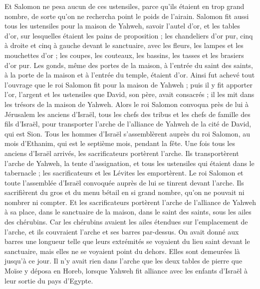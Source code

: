 \begin{multicols}{2}
Et Salomon ne pesa aucun de ces ustensiles, parce qu'ils étaient en trop grand nombre, de sorte qu'on ne rechercha point le poids de l’airain.
Salomon fit aussi tous les ustensiles pour la maison de Yahweh, savoir l'autel d'or, et les tables d'or, sur lesquelles étaient les pains de proposition ;
les chandeliers d’or pur, cinq à droite et cinq à gauche devant le sanctuaire, avec les fleurs, les lampes et les mouchettes d'or ;
les coupes, les couteaux, les bassins, les tasses et les brasiers d’or pur. Les gonds, même des portes de la maison, à l’entrée du saint des saints, à la porte de la maison et à l’entrée du temple, étaient d'or.
Ainsi fut achevé tout l'ouvrage que le roi Salomon fit pour la maison de Yahweh ; puis il y fit apporter l'or, l’argent et les ustensiles que David, son père, avait consacrés ; il les mit dans les trésors de la maison de Yahweh.
\VerseOne{}Alors le roi Salomon convoqua près de lui à Jérusalem les anciens d'Israël, tous les chefs des tribus et les chefs de famille des fils d'Israël, pour transporter l'arche de l'alliance de Yahweh de la cité de David, qui est Sion.
Tous les hommes d'Israël s’assemblèrent auprès du roi Salomon, au mois d'Ethanim, qui est le septième mois, pendant la fête.
Une fois tous les anciens d'Israël arrivés, les sacrificateurs portèrent l'arche.
Ils transportèrent l'arche de Yahweh, la tente d'assignation, et tous les ustensiles qui étaient dans le tabernacle ; les sacrificateurs et les Lévites les emportèrent.
Le roi Salomon et toute l'assemblée d'Israël convoquée auprès de lui se tinrent devant l'arche. Ils sacrifièrent du gros et du menu bétail en si grand nombre, qu'on ne pouvait ni nombrer ni compter.
Et les sacrificateurs portèrent l'arche de l'alliance de Yahweh à sa place, dans le sanctuaire de la maison, dans le saint des saints, sous les ailes des chérubins.
Car les chérubins avaient les ailes étendues sur l’emplacement de l'arche, et ils couvraient l'arche et ses barres par-dessus.
On avait donné aux barres une longueur telle que leurs extrémités se voyaient du lieu saint devant le sanctuaire, mais elles ne se voyaient point du dehors. Elles sont demeurées là jusqu'à ce jour.
Il n'y avait rien dans l'arche que les deux tables de pierre que Moïse y déposa en Horeb, lorsque Yahweh fit alliance avec les enfants d'Israël à leur sortie du pays d'Egypte.

\end{multicols}
